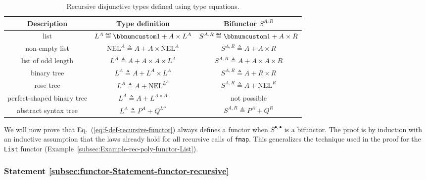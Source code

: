 \begin{table}
\begin{centering}
\begin{tabular}{|c|c|c|}
\hline 
\textbf{\small{}Description} & \textbf{\small{}Type definition} & \textbf{\small{}Bifunctor $S^{A,R}$}\tabularnewline
\hline 
\hline 
{\small{}list} & {\small{}$L^{A}\triangleq\bbnum 1+A\times L^{A}$} & {\small{}$S^{A,R}\triangleq\bbnum 1+A\times R$}\tabularnewline
\hline 
{\small{}non-empty list} & {\small{}$\text{NEL}^{A}\triangleq A+A\times\text{NEL}^{A}$} & {\small{}$S^{A,R}\triangleq A+A\times R$}\tabularnewline
\hline 
{\small{}list of odd length} & {\small{}$L^{A}\triangleq A+A\times A\times L^{A}$} & {\small{}$S^{A,R}\triangleq A+A\times A\times R$}\tabularnewline
\hline 
{\small{}binary tree} & {\small{}$L^{A}\triangleq A+L^{A}\times L^{A}$} & {\small{}$S^{A,R}\triangleq A+R\times R$}\tabularnewline
\hline 
{\small{}rose tree} & {\small{}$L^{A}\triangleq A+\text{NEL}^{L^{A}}$} & {\small{}$S^{A,R}\triangleq A+\text{NEL}^{R}$}\tabularnewline
\hline 
{\small{}perfect-shaped binary tree} & {\small{}$L^{A}\triangleq A+L^{A\times A}$} & {\small{}not possible}\tabularnewline
\hline 
{\small{}abstract syntax tree} & {\small{}$L^{A}\triangleq P^{A}+Q^{L^{A}}$} & {\small{}$S^{A,R}\triangleq P^{A}+Q^{R}$}\tabularnewline
\hline 
\end{tabular}
\par\end{centering}
\caption{Recursive disjunctive types defined using type equations.\label{tab:Examples-of-recursive-disjunctive-type-equations}}
\end{table}

We will now prove that Eq.~(\ref{eq:f-def-recursive-functor}) always
defines a functor when $S^{\bullet,\bullet}$ is a bifunctor. The
proof is by induction with an inductive assumption that the laws already
hold for all recursive calls of \lstinline!fmap!. This generalizes
the technique used in the proof for the \lstinline!List! functor
(Example~\ref{subsec:Example-rec-poly-functor-List}).

\subsubsection{Statement \label{subsec:functor-Statement-functor-recursive}\ref{subsec:functor-Statement-functor-recursive}}

